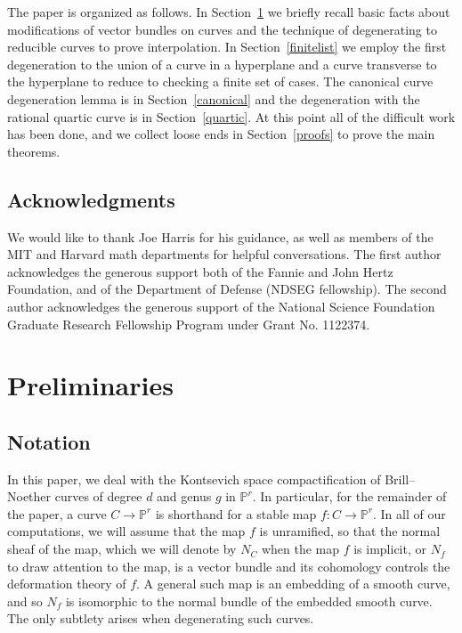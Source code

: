 \documentclass[11pt]{amsart}
\newcommand{\pp}{\mathbb{P}}
\theoremstyle{definition}
\theoremstyle{remark}
\begin{document}
The paper is organized as follows.  In Section~\ref{prelim} we briefly recall basic facts about modifications of vector bundles on curves and the technique of degenerating to reducible curves to prove interpolation.  In Section~\ref{finitelist} we employ the first degeneration to the union of a curve in a hyperplane and a curve transverse to the hyperplane to reduce to checking a finite set of cases.  The canonical curve degeneration lemma is in Section~\ref{canonical} and the degeneration with the rational quartic curve is in Section~\ref{quartic}.  At this point all of the difficult work has been done, and we collect loose ends in Section~\ref{proofs} to prove the main theorems.

\subsection*{Acknowledgments}
We would like to thank Joe Harris for his guidance, as well as members of the MIT and Harvard math departments for helpful conversations.  The first author acknowledges the generous support both of the Fannie and John Hertz Foundation, and
of the Department of Defense (NDSEG fellowship). The second author acknowledges the generous support of the National Science Foundation Graduate Research Fellowship Program under Grant No. 1122374.

\section{Preliminaries}\label{prelim}

\subsection{Notation}

In this paper, we deal with the Kontsevich space compactification of Brill--Noether curves of degree $d$ and genus $g$ in $\pp^r$.  In particular, for the remainder of the paper, a curve $C \to \pp^r$ is shorthand for a stable map $f \colon C \to \pp^r$.  In all of our computations, we will assume that the map $f$ is unramified, so that the normal sheaf of the map, which we will denote by $N_C$ when the map $f$ is implicit, or $N_f$ to draw attention to the map, 
is a vector bundle and its cohomology controls the deformation theory of $f$.  
A general such map is an embedding of a smooth curve, and so $N_f$ is isomorphic to the normal bundle of the embedded smooth curve.  The only subtlety arises when degenerating such curves.
\end{document}
